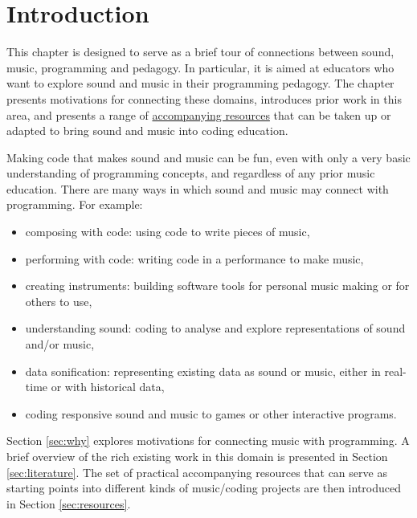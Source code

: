 


\section{Introduction}

This chapter is designed to serve as a brief tour of connections between sound, music, programming and pedagogy. In particular, it is aimed at educators who want to explore sound and music in their programming pedagogy. The chapter presents motivations for connecting these domains, introduces prior work in this area, and presents a range of \href{}{accompanying resources} that can be taken up or adapted to bring sound and music into coding education. 

Making code that makes sound and music can be fun, even with only a very basic understanding of programming concepts, and regardless of any prior music education. There are many ways in which sound and music may connect with programming. For example:

\begin{itemize}
    \item composing with code: using code to write pieces of music,
    \item performing with code: writing code in a performance to make music,
    \item creating instruments: building software tools for personal music making or for others to use,
    \item understanding sound: coding to analyse and explore representations of sound and/or music,
    \item data sonification: representing existing data as sound or music, either in real-time or with historical data,
    \item coding responsive sound and music to games or other interactive programs.
\end{itemize}

Section \ref{sec:why} explores motivations for connecting music with programming. A brief overview of the rich existing work in this domain is presented in Section \ref{sec:literature}. The set of practical accompanying resources that can serve as starting points into different kinds of music/coding projects are then introduced in Section \ref{sec:resources}. 

